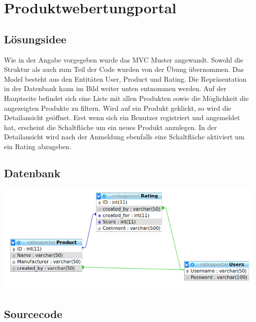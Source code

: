 \documentclass{article}
\begin{document}


\section{Produktwebertungportal}

\subsection{Lösungsidee}
Wie in der Angabe vorgegeben wurde das MVC Muster angewandt. Sowohl
die Struktur als auch zum Teil der Code wurden von der Übung übernommen.
Das Model besteht aus den Entitäten User, Product und Rating. Die
Repräsentation in der Datenbank kann im Bild weiter unten entnommen werden.
Auf der Hauptseite befindet sich eine Liste mit allen Produkten sowie
die Möglichkeit die angezeigten Produkte zu filtern. Wird auf ein Produkt
geklickt, so wird die Detailansicht geöffnet. Erst wenn sich ein Benutzer
registriert und angemeldet hat, erscheint die Schaltfläche um ein neues
Produkt anzulegen. In der Detailansicht wird nach der Anmeldung ebenfalls
eine Schaltfläche aktiviert um ein Rating abzugeben.

\subsection{Datenbank}

\includegraphics[width=1.0\textwidth]{dbmodel.png}




\subsection{Sourcecode}
\end{document}
